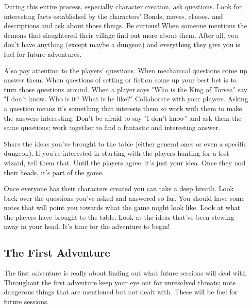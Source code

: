        

During this entire process, especially character creation, ask questions. Look for interesting facts established by the characters' Bonds, moves, classes, and descriptions and ask about those things. Be curious! When someone mentions the demons that slaughtered their village find out more about them. After all, you don't have anything (except maybe a dungeon) and everything they give you is fuel for future adventures.

       

Also pay attention to the players' questions. When mechanical questions come up answer them. When questions of setting or fiction come up your best bet is to turn those questions around. When a player says "Who is the King of Torsea" say "I don't know. Who is it? What is he like?" Collaborate with your players. Asking a question means it's something that interests them so work with them to make the answers interesting. Don't be afraid to say "I don't know" and ask them the same questions; work together to find a fantastic and interesting answer.

       

Share the ideas you've brought to the table (either general ones or even a specific dungeon). If you're interested in starting with the players hunting for a lost wizard, tell them that. Until the players agree, it's just your idea. Once they nod their heads, it's part of the game.

       

Once everyone has their characters created you can take a deep breath. Look back over the questions you've asked and answered so far. You should have some notes that will point you towards what the game might look like. Look at what the players have brought to the table. Look at the ideas that've been stewing away in your head. It's time for the adventure to begin!

       
\subsection{The First Adventure}   
       

The first adventure is really about finding out what future sessions will deal with. Throughout the first adventure keep your eye out for unresolved threats; note dangerous things that are mentioned but not dealt with. These will be fuel for future sessions.

       

